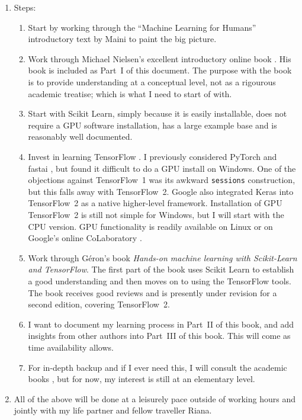 \begin{enumerate}
\item Steps:
\begin{enumerate}
\item Start by working through the ``Machine Learning for Humans'' introductory text by Maini \cite{Maini2017} to paint the big picture.
\item Work through Michael Nielsen's excellent introductory online book \cite{Nielsen2015}. His book is included as Part~I of this document.  The purpose with the book is to provide understanding at a conceptual level, not as a rigourous academic treatise; which is what I need to start of with. 
\item Start with Scikit Learn, simply because it is easily installable, does not require a \ac{GPU} software installation, has a large example base and is reasonably well documented.
\item Invest in learning TensorFlow \cite{TensorFlow2Alpha2019}.  I previously considered PyTorch \cite{paszkePyTorch2017,PyTorch2019} and fastai \cite{fastai2019}, but found it difficult to do a GPU install on Windows.  One of the objections against TensorFlow~1 was its awkward \lstinline{sessions}  construction, but this falls away with TensorFlow~2.  Google also integrated Keras \cite{cholletkeras2015,cholletkerasio2015} into TensorFlow~2 as a native higher-level framework.
    Installation of GPU TensorFlow~2 is still not simple for Windows, but I will start with the \ac{CPU} version. GPU functionality is readily available on Linux or on Google's online CoLaboratory \cite{GoogleCoLaboratory2019}.
\item Work through G\'{e}ron's book \cite{geron2017handson} \textit{Hands-on machine learning with Scikit-Learn and TensorFlow}.  The first part of the book uses Scikit Learn to establish a good understanding and then moves on to using the TensorFlow tools.
    The book receives good reviews and is presently under revision for a second edition, covering TensorFlow~2.
\item I want to document my learning process in Part~II of this book, and add insights from other authors into Part~III of this book. This will come as time availability allows.
\item For in-depth backup and if I ever need this, I will consult the academic books \cite{geron2017handson,Webb2002statpatn,Michie94,theodoridis2003,Duda2001,Bishop1995,Bishop2006,Goodfellow2016}, but for now, my interest is still at an elementary level.
\end{enumerate}
\item All of the above will be done at a leisurely pace outside of working hours and jointly with my life partner and fellow traveller Riana.
\end{enumerate}


